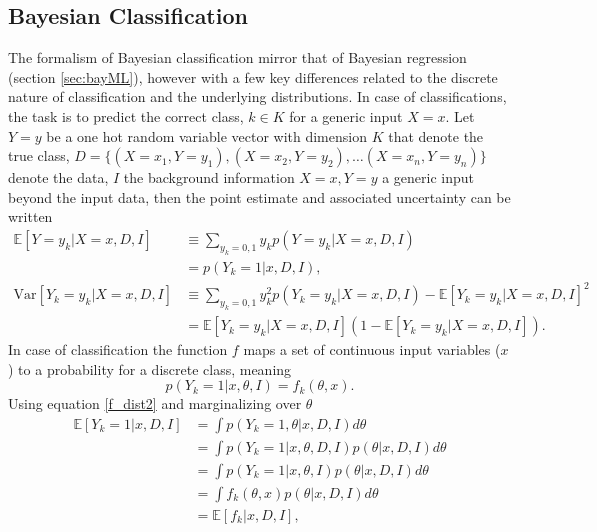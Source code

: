 \subsection{Bayesian Classification}
\label{sec:baycl}
The formalism of Bayesian classification mirror that of Bayesian regression (section \ref{sec:bayML}), however with a few key differences related to the discrete nature of classification and the underlying distributions. In case of classifications, the task is to predict the correct class, $k\in K$ for a generic input $X=x$. Let $Y=y$ be a one hot random variable vector with dimension $K$ that denote the true class, $D = \{(X=x_1, Y=y_1), (X=x_2, Y=y_2),\dots (X=x_n, Y=y_n)\}$ denote the data, $I$ the background information $X=x, Y=y$ a generic input beyond the input data, then the point estimate and associated uncertainty can be written 
\begin{equation}
	\begin{split}
		\mathbb{E}[Y = y_k|X =x,D,I] & \equiv \sum_{y_k=0,1}y_k p(Y = y_k|X = x,D,I)\\
		&= p(Y_k = 1|x,D,I),\\
		\text{Var}[Y_k = y_k|X = x,D,I] & \equiv \sum_{y_k=0,1}y_k^2 p(Y_k =y_k|X = x,D,I)-\mathbb{E}[Y_k = y_k|X = x,D,I]^2\\
		&=\mathbb{E}[Y_k = y_k|X = x,D,I](1-\mathbb{E}[Y_k = y_k|X = x,D,I]).
	\end{split}
	\label{eq:q6}
\end{equation}	
In case of classification the function $f$ maps a set of continuous input variables ($x$) to a probability for a discrete class, meaning ~\citep{Saerens2002}
\begin{equation}
	p(Y_k = 1|x,\theta,I)= f_k(\theta,x).
	\label{f_dist2}
\end{equation}
Using equation \eqref{f_dist2} and marginalizing over $\theta$
\begin{equation}
	\begin{split}
		\mathbb{E}[Y_k = 1|x,D,I] &= \int p(Y_k = 1,\theta|x,D,I) d\theta \\
		& = \int p(Y_k = 1|x,\theta,D,I)  p(\theta|x,D,I)d\theta \\
		& = \int p(Y_k=1|x,\theta,I)  p(\theta|x,D,I)d\theta \\
		& = \int f_k(\theta,x)  p(\theta|x,D,I)d\theta \\
		& = \mathbb{E}[f_k|x,D,I],\\
	\end{split}
	\label{eq:q5}
\end{equation}
